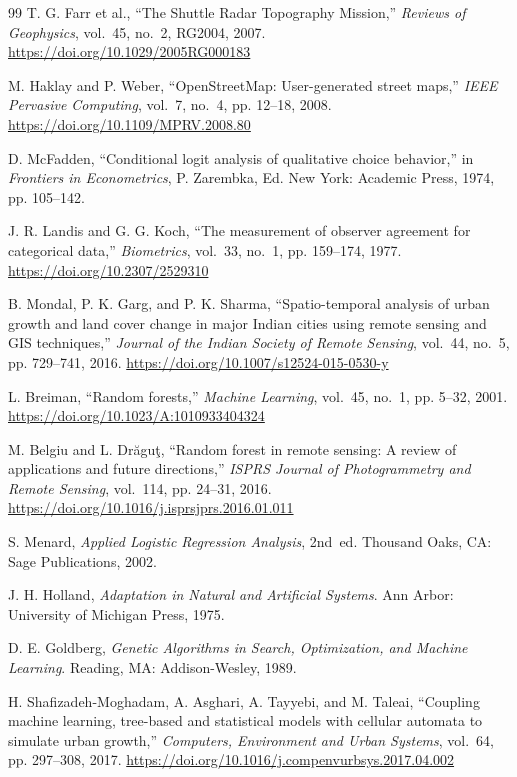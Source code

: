 \documentclass[conference]{IEEEtran}
\begin{document}
\begin{thebibliography}{99}
T. G. Farr et al., ``The Shuttle Radar Topography Mission,'' \textit{Reviews of Geophysics}, vol.~45, no.~2, RG2004, 2007.
\url{https://doi.org/10.1029/2005RG000183}

M. Haklay and P. Weber, ``OpenStreetMap: User-generated street maps,'' \textit{IEEE Pervasive Computing}, vol.~7, no.~4, pp. 12--18, 2008.
\url{https://doi.org/10.1109/MPRV.2008.80}

D. McFadden, ``Conditional logit analysis of qualitative choice behavior,'' in \textit{Frontiers in Econometrics}, P. Zarembka, Ed. New York: Academic Press, 1974, pp. 105--142.

J. R. Landis and G. G. Koch, ``The measurement of observer agreement for categorical data,'' \textit{Biometrics}, vol.~33, no.~1, pp. 159--174, 1977.
\url{https://doi.org/10.2307/2529310}

B. Mondal, P. K. Garg, and P. K. Sharma, ``Spatio-temporal analysis of urban growth and land cover change in major Indian cities using remote sensing and GIS techniques,'' \textit{Journal of the Indian Society of Remote Sensing}, vol.~44, no.~5, pp. 729--741, 2016.
\url{https://doi.org/10.1007/s12524-015-0530-y}

L. Breiman, ``Random forests,'' \textit{Machine Learning}, vol.~45, no.~1, pp. 5--32, 2001.
\url{https://doi.org/10.1023/A:1010933404324}

M. Belgiu and L. Dr\u{a}gu\c{t}, ``Random forest in remote sensing: A review of applications and future directions,'' \textit{ISPRS Journal of Photogrammetry and Remote Sensing}, vol.~114, pp. 24--31, 2016.
\url{https://doi.org/10.1016/j.isprsjprs.2016.01.011}

S. Menard, \textit{Applied Logistic Regression Analysis}, 2nd~ed. Thousand Oaks, CA: Sage Publications, 2002.

J. H. Holland, \textit{Adaptation in Natural and Artificial Systems}. Ann Arbor: University of Michigan Press, 1975.

D. E. Goldberg, \textit{Genetic Algorithms in Search, Optimization, and Machine Learning}. Reading, MA: Addison-Wesley, 1989.


H. Shafizadeh-Moghadam, A. Asghari, A. Tayyebi, and M. Taleai, ``Coupling machine learning, tree-based and statistical models with cellular automata to simulate urban growth,'' \textit{Computers, Environment and Urban Systems}, vol.~64, pp. 297--308, 2017.
\url{https://doi.org/10.1016/j.compenvurbsys.2017.04.002}


\end{thebibliography}
\end{document}
